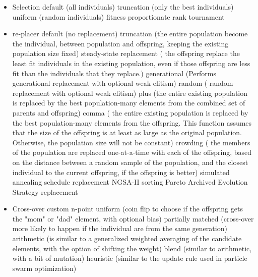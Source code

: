 \documentclass{article}
\begin{document}
        \begin{itemize}
            \item  Selection
            \subitem default  (all individuals)
            \subitem truncation (only the best individuals)
            \subitem uniform (random individuals)
            \subitem fitness proportionate
            \subitem rank
            \subitem tournament
            \item re-placer 
             \subitem default  (no replacement)
            \subitem truncation (the entire population become the individual, between population and offspring,  keeping the existing population size fixed)
            \subitem steady-state replacement ( the offspring replace the least fit individuals in the existing
    population, even if those offspring are less fit than the individuals
    that they replace.)
            \subitem generational (Performs generational replacement with optional weak elitism)
            \subitem random ( random replacement with optional weak elitism)
            \subitem plus (the entire existing population is replaced by the best population-many elements from the combined set of parents and offspring)
            \subitem comma ( the entire existing population is replaced by the best population-many elements from the offspring. This function assumes that the size of the offspring is at least as large as the original population. Otherwise, the    population size will not be constant)
            \subitem crowding (  the members of the population are replaced one-at-a-time with each of the offspring, based on the distance between a random sample of the population, and the closest individual to the current offspring, if the offspring is better)
            \subitem simulated annealing schedule replacement
            \subitem NGSA-II sorting
            \subitem  Pareto Archived Evolution Strategy replacement
            \item Cross-over
            \subitem custom
            \subitem n-point
            \subitem uniform (coin flip to choose if the offspring gets the "mom" or "dad" element, with optional bias)
            \subitem partially matched (cross-over more likely to happen if the individual are from the same generation)
            \subitem arithmetic (is similar to a generalized weighted averaging of the candidate elements, with the option of shifting the weight)
            \subitem blend (similar to arithmetic, with a bit of mutation)
            \subitem heuristic (similar to the update rule used in particle swarm optimization)

\end{itemize}
\end{document}
